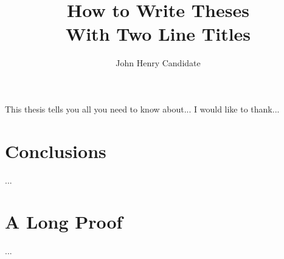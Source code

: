\documentclass{report}
\begin{document}
\linenumbers

\title{How to Write Theses\\
            With Two Line Titles}
\author{John Henry Candidate}
 
\beforepreface
{}
This thesis tells you all you need to know about...
I would like to thank...
\afterpreface



\chapter{Conclusions}
...
\appendix
\chapter{A Long Proof}
...

\printbibliography
\end{document}
